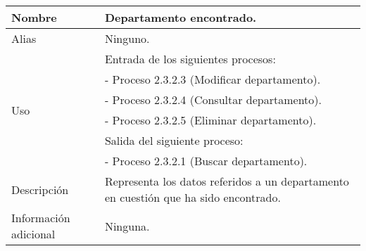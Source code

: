 \begin{center}
  \begin{tabular}{| l | p{9cm} |}
    \hline
    Nombre & \textbf{Departamento encontrado}.\\
    \hline
    Alias & Ninguno.\\
    \hline
    \multirow{6}{*}{Uso} & Entrada de los siguientes procesos:\\
                         & - Proceso 2.3.2.3 (Modificar departamento).\\
                         & - Proceso 2.3.2.4 (Consultar departamento).\\
                         & - Proceso 2.3.2.5 (Eliminar departamento).\\
                         & Salida del siguiente proceso:\\
                         & - Proceso 2.3.2.1 (Buscar departamento).\\
    \hline
    Descripción & Representa los datos referidos a un departamento en cuestión
                  que ha sido encontrado.\\
    \hline
    Información adicional & Ninguna.\\
    \hline
  \end{tabular}
\end{center}
